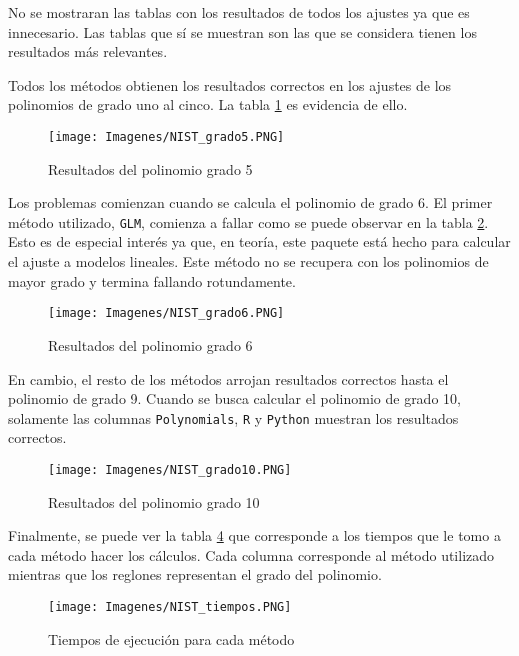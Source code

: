 No se mostraran las tablas con los resultados de todos los ajustes ya que es innecesario. Las tablas que sí se muestran son las que se considera tienen los resultados más relevantes. 

Todos los métodos obtienen los resultados correctos en los ajustes de los polinomios de grado uno al cinco. La tabla \ref{NIST_res_gr5} es evidencia de ello. 

\begin{figure}[h]
\begin{center}
\texttt{[image: Imagenes/NIST\_grado5.PNG]}
\caption{Resultados del polinomio grado 5}
\label{NIST_res_gr5}
\end{center}
\end{figure}

Los problemas comienzan cuando se calcula el polinomio de grado 6. El primer método utilizado, \texttt{GLM}, comienza a fallar como se puede observar en la tabla \ref{NIST_res_gr6}. Esto es de especial interés ya que, en teoría, este paquete está hecho para calcular el ajuste a modelos lineales. Este método no se recupera con los polinomios de mayor grado y termina fallando rotundamente. 

\begin{figure}[h]
\begin{center}
\texttt{[image: Imagenes/NIST\_grado6.PNG]}
\caption{Resultados del polinomio grado 6}
\label{NIST_res_gr6}
\end{center}
\end{figure}

En cambio, el resto de los métodos arrojan resultados correctos hasta el polinomio de grado 9. Cuando se busca calcular el polinomio de grado 10, solamente las columnas \texttt{Polynomials}, \texttt{R} y \texttt{Python} muestran los resultados correctos. 

\begin{figure}[h]
\begin{center}
\texttt{[image: Imagenes/NIST\_grado10.PNG]}
\caption{Resultados del polinomio grado 10}
\label{NIST_res_gr10}
\end{center}
\end{figure}

Finalmente, se puede ver la tabla \ref{NIST_tiempos} que corresponde a los tiempos que le tomo a cada método hacer los cálculos. Cada columna corresponde al método utilizado mientras que los reglones representan el grado del polinomio. 


\begin{figure}[h]
\begin{center}
\texttt{[image: Imagenes/NIST\_tiempos.PNG]}
\caption{Tiempos de ejecución para cada método}
\label{NIST_tiempos}
\end{center}
\end{figure}

